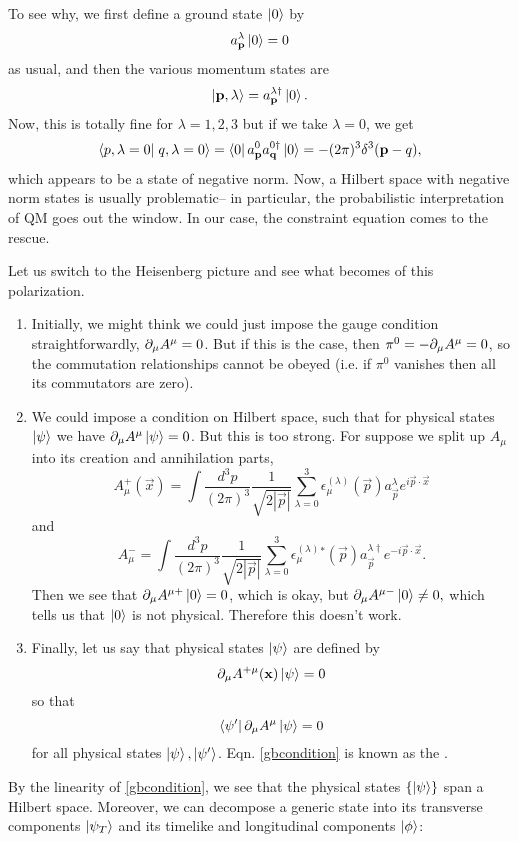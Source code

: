 To see why, we first define a ground state $\left| 0 \right>$ by
$$a_{\boldsymbol{\mathbf{p}}}^\lambda \left| 0 \right>=0$$ as usual, and then the various momentum states are
$$\left| \boldsymbol{\mathbf{p}},\lambda \right>=a_{\boldsymbol{\mathbf{p}}}^{\lambda \dagger}\left| 0 \right>.$$
Now, this is totally fine for $\lambda=1,2,3$ but if we take $\lambda=0$, we get
$$\braket{p,\lambda=0}{q,\lambda=0}=\bra{0}a_{\vec p}^0 a_{\vec q}^{0\dagger} \ket{0}=-(2\pi)^3 \delta^3(\vec p-q),$$
which appears to be a state of negative norm. Now, a Hilbert space with negative norm states is usually problematic-- in particular, the probabilistic interpretation of QM goes out the window. In our case, the constraint equation comes to the rescue.

Let us switch to the Heisenberg picture and see what becomes of this polarization.
\begin{enumerate}
    \item Initially, we might think we could just impose the gauge condition straightforwardly, $\partial_\mu A^\mu=0$. But if this is the case, then $\pi^0 = -\partial_\mu A^\mu = 0$, so the commutation relationships cannot be obeyed (i.e. if $\pi^0$ vanishes then all its commutators are zero).
    \item We could impose a condition on Hilbert space, such that for physical states $\left| \psi \right>$ we have $\partial_\mu A^\mu\left| \psi \right>=0$. But this is too strong. For suppose we split up $A_\mu$ into its creation and annihilation parts,
    $$A_\mu^+(\vec x)=\int \frac{d^3p}{(2\pi)^3} \frac{1}{\sqrt{2|\vec p|}} \sum_{\lambda=0}^3 \epsilon_\mu^{(\lambda)}(\vec p) a_{\vec p}^\lambda e^{i \vec p \cdot \vec x}$$
    and
    $$A_\mu^-=\int \frac{d^3p}{(2\pi)^3} \frac{1}{\sqrt{2|\vec p|}} \sum_{\lambda=0}^3 \epsilon_\mu^{(\lambda)}{}^* (\vec p) a_{\vec p}^{\lambda \dagger} e^{-i\vec p \cdot \vec x}.$$
    Then we see that $\partial_\mu A^{\mu+}\left| 0 \right>=0$, which is okay, but $\partial_\mu A^{\mu-}\left| 0 \right>\neq 0,$ which tells us that $\left| 0 \right>$ is not physical. Therefore this doesn't work.
    \item Finally, let us say that physical states $\left| \psi \right>$ are defined by
    \begin{equation}\label{gbcondition}
        \partial_\mu A^{+\mu}(\boldsymbol{\mathbf{x}})\left| \psi \right>=0
    \end{equation}
    so that
    $$\left< \psi' \right|\partial_\mu A^\mu \left| \psi \right>=0$$
    for all physical states $\left| \psi \right>,\left| \psi' \right>$. Eqn. \ref{gbcondition} is known as the .
\end{enumerate}
By the linearity of \ref{gbcondition}, we see that the physical states $\{\left| \psi \right>\}$ span a Hilbert space. Moreover, we can decompose a generic state into its transverse components $\left| \psi_T \right>$ and its timelike and longitudinal components $\left| \phi \right>$:
